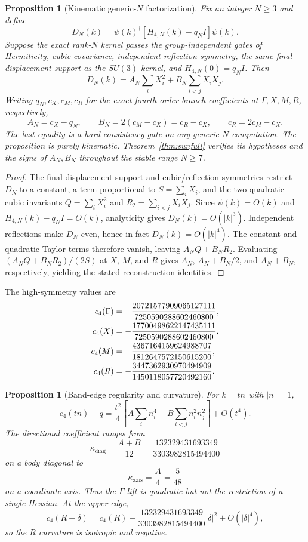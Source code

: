 \documentclass[11pt]{article}
\newtheorem{proposition}[theorem]{Proposition}
\begin{document}
\begin{proposition}[Kinematic generic-$N$ factorization]
\label{prop:sunh4conditional}
Fix an integer $N\geq3$ and define
\[
D_N(k)=\psi(k)^\dagger[H_{4,N}(k)-q_NI]\psi(k).
\]
Suppose the exact rank-$N$ kernel passes the group-independent gates of
Hermiticity, cubic covariance, independent-reflection symmetry, the same final
displacement support as the $SU(3)$ kernel, and
$H_{4,N}(0)=q_NI$. Then
\[
D_N(k)=A_N\sum_iX_i^2+B_N\sum_{i<j}X_iX_j.
\]
Writing $q_N,c_X,c_M,c_R$ for the exact fourth-order branch coefficients at
$\Gamma,X,M,R$, respectively,
\[
A_N=c_X-q_N,
\qquad
B_N=2(c_M-c_X)=c_R-c_X,
\qquad
c_R=2c_M-c_X.
\]
The last equality is a hard consistency gate on any generic-$N$ computation.
The proposition is purely kinematic. Theorem~\ref{thm:sunfull} verifies its
hypotheses and the signs of $A_N,B_N$ throughout the stable range $N\geq7$.
\end{proposition}

\begin{proof}
The final displacement support and cubic/reflection symmetries restrict $D_N$
to a constant, a term proportional to $S=\sum_iX_i$, and the two quadratic
cubic invariants $Q=\sum_iX_i^2$ and
$R_2=\sum_{i<j}X_iX_j$. Since $\psi(k)=O(k)$ and
$H_{4,N}(k)-q_NI=O(k)$, analyticity gives $D_N(k)=O(|k|^3)$.
Independent reflections make $D_N$ even, hence in fact
$D_N(k)=O(|k|^4)$. The constant and quadratic Taylor terms therefore vanish,
leaving $A_NQ+B_NR_2$. Evaluating $(A_NQ+B_NR_2)/(2S)$ at $X$, $M$, and $R$
gives $A_N$, $A_N+B_N/2$, and $A_N+B_N$, respectively, yielding the stated
reconstruction identities.
\end{proof}

The high-symmetry values are
\begin{align}
c_4(\Gamma)&=-\frac{20721577909065127111}{7250590288602460800},\notag\\
c_4(X)&=-\frac{17700498622147435111}{7250590288602460800},\notag\\
c_4(M)&=-\frac{4367164159624988707}{1812647572150615200},\notag\\
c_4(R)&=-\frac{3447362930970494909}{1450118057720492160}.
\label{eq:bandpoints4}
\end{align}

\begin{proposition}[Band-edge regularity and curvature]\label{prop:y4curvature}
For $k=tn$ with $|n|=1$,
\begin{equation}
c_4(tn)-q
=\frac{t^2}{4}
\left[A\sum_i n_i^4+B\sum_{i<j}n_i^2n_j^2\right]+O(t^4).
\label{eq:gammacurv}
\end{equation}
The directional coefficient ranges from
\[
\kappa_{\mathrm{diag}}=\frac{A+B}{12}
=\frac{132329431693349}{3303982815494400}
\]
on a body diagonal to
\[
\kappa_{\mathrm{axis}}=\frac{A}{4}=\frac5{48}
\]
on a coordinate axis. Thus the $\Gamma$ lift is quadratic but not the
restriction of a single Hessian. At the upper edge,
\begin{equation}
c_4(R+\delta)=c_4(R)
-\frac{132329431693349}{3303982815494400}|\delta|^2
+O(|\delta|^4),
\label{eq:Rcurv}
\end{equation}
so the $R$ curvature is isotropic and negative.
\end{proposition}
\end{document}
